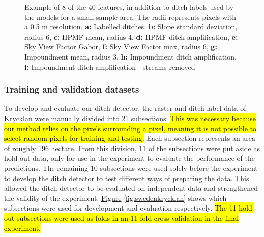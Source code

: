 \documentclass[11pt, review]{elsarticle} %
\begin{document}
\begin{figure} [!htb]
{        }
    \caption{Example of 8 of the 40 features, in addition to ditch labels used by the models for a small sample area. The radii represents pixels with a 0.5 m resolution. \newline \textbf{a:} Labelled ditches, \textbf{b:} Slope standard deviation, radius 6, \textbf{c:} HPMF mean, radius 4, \textbf{d:} HPMF ditch amplification, \textbf{e:} Sky View Factor Gabor, \textbf{f:} Sky View Factor max, radius 6, \textbf{g:} Impoundment mean, radius 3, \textbf{h:} Impoundment ditch amplification, \textbf{i:} Impoundment ditch amplification - streams removed}
    \label{fig:features}
\end{figure}

\subsubsection{Training and validation datasets}
\label{trainingvalidationdatasets}
To develop and evaluate our ditch detector, the raster and ditch label data of Krycklan were manually divided into 21 subsections. \hl{This was necessary because our method relies on the pixels surrounding a pixel, meaning it is not possible to select random pixels for training and testing.} Each subsection represents an area of roughly 196 hectare. From this division, 11 of the subsections were put aside as hold-out data, only for use in the experiment to evaluate the performance of the predictions. The remaining 10 subsections were used solely before the experiment to develop the ditch detector to test different ways of preparing the data. This allowed the ditch detector to be evaluated on  independent data and  strengthened the validity of the experiment. \hyperref[fig:swedenkrycklan]{Figure} \ref{fig:swedenkrycklan} shows which subsections were used for development and evaluation respectively. \hl{The 11 hold-out subsections were used as folds in an 11-fold cross validation in the final experiment.}
\end{document}
